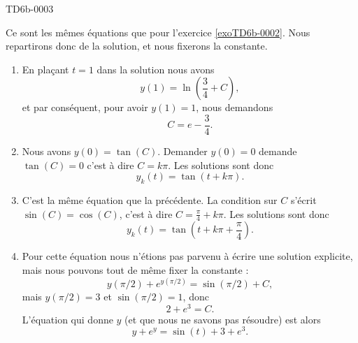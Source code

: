 
\begin{corrige}{TD6b-0003}

    Ce sont les mêmes équations que pour l'exercice \ref{exoTD6b-0002}. Nous repartirons donc de la solution, et nous fixerons la constante.

    \begin{enumerate}
            

    \item

        En plaçant \( t=1\) dans la solution nous avons
        \begin{equation}
            y(1)=\ln\left( \frac{ 3 }{ 4 }+C \right),
        \end{equation}
        et par conséquent, pour avoir \( y(1)=1\), nous demandons
        \begin{equation}
            C=e-\frac{ 3 }{ 4 }.
        \end{equation}
        
    \item

        Nous avons \( y(0)=\tan(C)\). Demander \( y(0)=0\) demande \( \tan(C)=0\) c'est à dire \( C=k\pi\). Les solutions sont donc
        \begin{equation}
            y_k(t)=\tan(t+k\pi).
        \end{equation}
    \item
        C'est la même équation que la précédente. La condition sur \( C\) s'écrit \( \sin(C)=\cos(C)\), c'est à dire \( C=\frac{ \pi }{ 4 }+k\pi\). Les solutions sont donc
        \begin{equation}
            y_k(t)=\tan(t+k\pi+\frac{ \pi }{ 4 }).
        \end{equation}

    \item

        Pour cette équation nous n'étions pas parvenu à écrire une solution explicite, mais nous pouvons tout de même fixer la constante :
        \begin{equation}
            y(\pi/2)+ e^{y(\pi/2)}=\sin(\pi/2)+C,
        \end{equation}
        mais \( y(\pi/2)=3\) et \( \sin(\pi/2)=1\), donc
        \begin{equation}
            2+ e^{3}=C.
        \end{equation}
        L'équation qui donne \( y\) (et que nous ne savons pas résoudre) est alors
        \begin{equation}
            y+ e^{y}=\sin(t)+3+e^3.
        \end{equation}
        

\end{enumerate}
\end{corrige}
